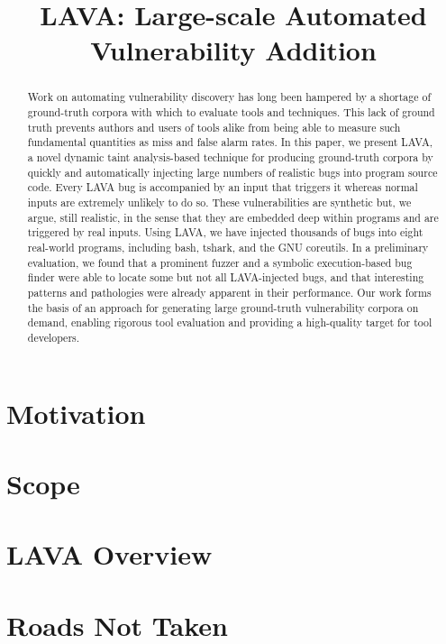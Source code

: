 \documentclass[conference]{IEEEtran}
\title{LAVA: Large-scale Automated Vulnerability Addition}
\begin{document}
\maketitle

\begin{abstract}

Work on automating vulnerability discovery has long been hampered by a shortage of ground-truth corpora with which to evaluate tools and techniques.
This lack of ground truth prevents authors and users of tools alike from being able to measure such fundamental quantities as  miss and false alarm rates.
In this paper, we present LAVA, a novel dynamic taint analysis-based technique for producing ground-truth corpora by quickly and automatically injecting large numbers of realistic bugs into program source code.
Every LAVA bug is accompanied by an input that triggers it whereas normal inputs are extremely unlikely to do so.
These vulnerabilities are synthetic but, we argue, still realistic, in the sense that they are embedded deep within programs and are triggered by real inputs.
Using LAVA, we have injected thousands of bugs into eight real-world programs, including bash, tshark, and the GNU coreutils.
In a preliminary evaluation, we found that a prominent fuzzer and a symbolic execution-based bug finder were able to locate some but not all LAVA-injected bugs, and that interesting patterns and pathologies were already apparent in their performance.
Our work forms the basis of an approach for generating large ground-truth vulnerability corpora on demand, enabling rigorous tool evaluation and providing a high-quality target for tool developers.

\end{abstract}

\section{Motivation}
\label{sec:motivation}


\section{Scope}
\label{sec:scope}


\section{LAVA Overview}
\label{sec:overview}


\section{Roads Not Taken}
\label{sec:altdesign}

\end{document}
